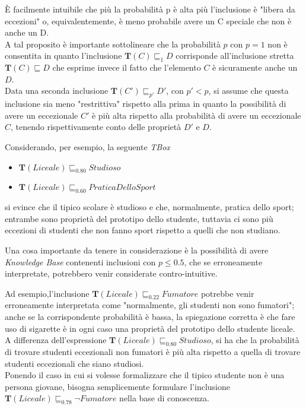 È facilmente intuibile che più la probabilità p è alta più l’inclusione è "libera da eccezioni" o, 
equivalentemente, è meno probabile avere un C speciale che non è anche un D.\\
A tal proposito è importante sottolineare che la probabilità $ p $  con $ p = 1 $ non è consentita 
in quanto l’inclusione $ \mathbf{T}(C) \sqsubseteq_{1} D  $
corrisponde all'inclusione stretta $ \mathbf{T}(C) \sqsubseteq D $ che esprime invece il fatto che
l’elemento $ C $ è sicuramente anche un $ D $.\\
Data una seconda inclusione $ \mathbf{T}(C') \sqsubseteq_{p'} D' $, con $ p' < p $, si assume che questa
inclusione sia meno "restrittiva" rispetto alla prima in quanto la possibilità di avere un
eccezionale $ C' $ è più alta rispetto alla probabilità di avere un eccezionale $ C $, tenendo rispettivamente
conto delle proprietà $ D' \text{ e } D $.

Considerando, per esempio, la seguente \textit{TBox}
\begin{itemize}
	\item $ \mathbf{T}(Liceale) \sqsubseteq_{0.80} Studioso $
	\item $ \mathbf{T}(Liceale) \sqsubseteq_{0.60} PraticaDelloSport $
\end{itemize}
si evince che il tipico scolare è studioso e che, normalmente, pratica dello sport;
entrambe sono proprietà del prototipo dello studente, tuttavia ci sono più
eccezioni di studenti che non fanno sport rispetto a quelli che non studiano.

Una cosa importante da tenere in considerazione è la possibilità di avere \textit{Knowledge Base}
contenenti inclusioni con $ p \leq 0.5 $, che se
erroneamente interpretate, potrebbero venir considerate contro-intuitive.

Ad esempio,l’inclusione $ \mathbf{T}(Liceale) \sqsubseteq_{0.22} Fumatore  $  potrebbe venir erroneamente 
interpretata come "normalmente, gli studenti non sono fumatori"; anche se la corrispondente probabilità è bassa, 
la spiegazione corretta è che fare uso di sigarette è in ogni caso una 
proprietà del prototipo dello studente liceale.\\
A differenza dell'espressione $ \mathbf{T}(Liceale) \sqsubseteq_{0.80} Studioso $, si ha che la
probabilità di trovare studenti eccezionali non fumatori è più alta rispetto a quella
di trovare studenti eccezionali che siano studiosi.\\
Ponendo il caso in cui si volesse formalizzare che il tipico studente non è una persona giovane, bisogna 
semplicemente formulare l’inclusione $ \mathbf{T}(Liceale) \sqsubseteq_{0.78} \neg Fumatore  $ nella base di conoscenza.

